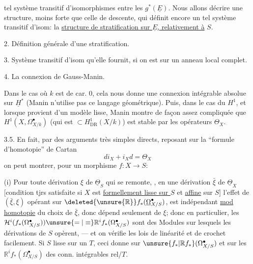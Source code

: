 
tel système transitif d'isomorphismes entre les $g^*(\underline{E})$.
Nous allons décrire une structure,  moins forte que celle de descente, qui définit encore un tel système transitif d'isom: la \uline{structure de stratification sur $\underline{E}$, relativement à} $S$.

2. Définition générale d'une stratification.

3. Système transitif d'isom qu'elle fournit, si on est sur un anneau local complet.

4. La  connexion de Gauss-Manin.


Dans le cas où $k$ est de car. 0, cela nous donne une connexion intégrable absolue sur $\underline{H}^*$ (Manin n'utilise pas ce langage géométrique).
Puis, dans le cas du $H^1$, et lorsque  provient d'un modèle  lisse, Manin montre de façon assez compliquée que
$H^1(X,\Omega^\bullet_{X/k})$ (qui est $\subset H^1_{\mathrm{DR}}(X/k)$) est stable par les opérateurs $\Theta_X$.

3.5. En fait, par des arguments très simples directs,  reposant sur la ``formule d'homotopie'' de Cartan
\[
d i_X+i_X d=\Theta_X
\]
on peut montrer, pour un morphisme $f:X\longrightarrow S$:

(i) Pour toute dérivation $\xi$ de $\underline{\Theta}_S$ qui se remonte, ,  en une dérivation $\bar{\xi}$ de $\underline{\Theta}_X$ [condition tjrs satisfaite si $X$ est  \uline{formellement lisse sur $S$} et \uline{affine} sur $S$]
l'effet de $(\bar{\xi},\xi)$ opérant sur $\deleted{\unsure{\mathbb{R}}}f_*(\underline{\Omega}^\bullet_{X/S})$, est indépendant \uline{mod homotopie}  du choix de $\bar{\xi}$, donc dépend seulement de $\xi$; donc en particulier,  les
$\mathcal{H}^i(f_*(\Omega^\bullet_{X/S}))\unsure{=|\equiv}\mathbb{R}^if_*(\Omega^\bullet_{X/S})$
sont des Modules sur lesquels les dérivations de $S$ opèrent, --- et on vérifie les lois de linéarité et de crochet facilement.
Si $S$ lisse sur un $T$, ceci donne sur $\unsure{f_*|\mathbb{R}f_*}(\Omega^\bullet_{X/S})$ et sur les $\mathbb{R}^if_*(\Omega^\bullet_{X/S})$ des conn. intégrables rel/$T$.



